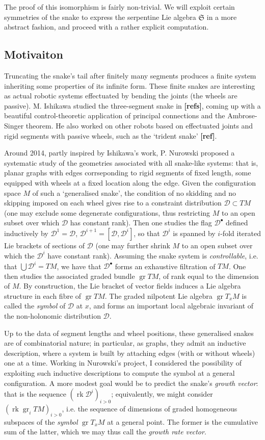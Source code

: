 \documentclass{article}
\def\fS{\mathfrak{S}}
\def\sD{\mathscr{D}}
\DeclareMathOperator{\gr}{\mathrm{gr}}
\DeclareMathOperator{\rk}{\mathrm{rk}}
\theoremstyle{definition}
\begin{document}
The proof of this isomorphism is fairly non-trivial. We will exploit certain symmetries
of the snake to express the serpentine Lie algebra $\fS$ in a more abstract fashion,
and proceed with a rather explicit computation. 

\subsection{Motivaiton}
Truncating the snake's tail after finitely many segments
produces a finite system inheriting some properties of 
its infinite form. 
These finite snakes are interesting as actual
robotic systems effectuated by bending the joints (the wheels are passive). 
M. Ishikawa studied the three-segment snake in \textbf{[refs]},
coming up with a beautiful control-theoretic application of
principal connections and the Ambrose-Singer theorem. He also worked on other robots based on
effectuated joints and rigid segments with passive wheels, such as
the `trident snake' \textbf{[ref]}.

Around 2014, partly inspired by Ishikawa's work, P. Nurowski proposed 
a systematic study of the geometries associated with all snake-like systems: 
that is, planar graphs with edges corrseponding to rigid segments of fixed
length, some equipped with wheels at a fixed location along the edge. 
Given the configuration space $M$ of such a `generalised snake', 
the condition of no skidding and no skipping imposed on each wheel
gives rise to a constraint distribution $\sD \subset TM$ (one may 
exclude some degenerate configurations, thus restricting $M$ to an 
open subset over which $\sD$ has constant rank). Then one studies
the flag $\sD^\bullet$ defined inductively by $\sD^1 = \sD$,
$\sD^{i+1}=[\sD,\sD^i]$, so that $\sD^{i}$
is spanned by $i$-fold iterated Lie brackets of sections of $\sD$
(one may further shrink $M$ to an open subset over which
the $\sD^i$ have constant rank). Assuming the snake system is \emph{controllable},
i.e. that $\bigcup \sD^i=TM$, we have that $\sD^\bullet$
forms an exhaustive filtration of $TM$. One then studies the associated graded
bundle $\gr TM$, of rank equal to the dimension of $M$. By construction, the Lie
bracket of vector fields induces a Lie algebra structure in each fibre of $\gr TM$.
The graded nilpotent Lie algebra $\gr T_x M$ is called the \emph{symbol} of $\sD$ at $x$, and forms
an important local algebraic invariant of the non-holonomic distribution $\sD$.

Up to the data of segment lengths and wheel positions, these generalised snakes
are of combinatorial nature; in particular, as graphs, they admit an inductive
description, where a system is built by attaching edges (with or without wheels)
one at a time. Working in Nurowski's project, I considered the possibility of exploiting
such inductive descriptions to compute the symbol at a general configuration.
A more modest goal would be to predict the snake's \emph{growth vector}: that is
the sequence $(\rk\sD^i)_{i>0}$; equivalently, we might consider
$(\rk \gr_iTM)_{i>0}$, i.e. 
the sequence of dimensions
of graded homogeneous subspaces of the \emph{symbol} $\gr T_x M$ at a general point.
The former is the cumulative sum of the latter, which we may thus call the
\emph{growth rate vector}.
\end{document}
